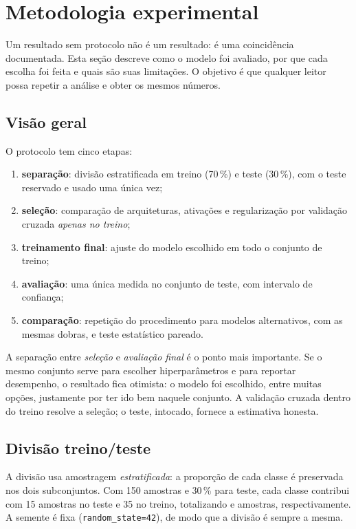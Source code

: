\section{Metodologia experimental}
\label{sec:metodo}

Um resultado sem protocolo não é um resultado: é uma coincidência documentada. Esta seção descreve
como o modelo foi avaliado, por que cada escolha foi feita e quais são suas limitações. O objetivo
é que qualquer leitor possa repetir a análise e obter os mesmos números.

\subsection{Visão geral}

O protocolo tem cinco etapas:

\begin{enumerate}
	\item \textbf{separação}: divisão estratificada em treino (70\,\%) e teste (30\,\%), com o teste
	      reservado e usado uma única vez;
	\item \textbf{seleção}: comparação de arquiteturas, ativações e regularização por validação
	      cruzada \emph{apenas no treino};
	\item \textbf{treinamento final}: ajuste do modelo escolhido em todo o conjunto de treino;
	\item \textbf{avaliação}: uma única medida no conjunto de teste, com intervalo de confiança;
	\item \textbf{comparação}: repetição do procedimento para modelos alternativos, com as mesmas
	      dobras, e teste estatístico pareado.
\end{enumerate}

A separação entre \emph{seleção} e \emph{avaliação final} é o ponto mais importante. Se o mesmo
conjunto serve para escolher hiperparâmetros e para reportar desempenho, o resultado fica otimista:
o modelo foi escolhido, entre muitas opções, justamente por ter ido bem naquele conjunto. A
validação cruzada dentro do treino resolve a seleção; o teste, intocado, fornece a estimativa
honesta.

\subsection{Divisão treino/teste}

A divisão usa amostragem \emph{estratificada}: a proporção de cada classe é preservada nos dois
subconjuntos. Com 150 amostras e 30\,\% para teste, cada classe contribui com 15 amostras no teste
e 35 no treino, totalizando \nTeste{} e \nTreino{} amostras, respectivamente. A semente é fixa
(\texttt{random\_state=42}), de modo que a divisão é sempre a mesma.

